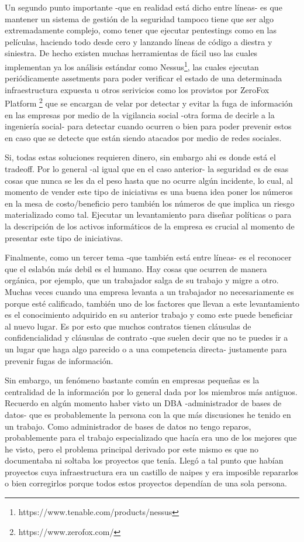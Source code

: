 \documentclass[11pt]{utalcaDoc}
\begin{document}
Un segundo punto importante -que en realidad está dicho entre líneas- es que mantener un sistema de gestión de la seguridad tampoco tiene que ser algo extremadamente complejo, como tener que ejecutar pentestings como en las películas, haciendo todo desde cero y lanzando líneas de código a diestra y siniestra. De hecho existen muchas herramientas de fácil uso las cuales implementan ya los análisis estándar como Nessus\footnote{https://www.tenable.com/products/nessus}, las cuales ejecutan periódicamente assetments para poder verificar el estado de una determinada infraestructura expuesta u otros serivicios como los provistos por ZeroFox Platform \footnote{https://www.zerofox.com/} que se encargan de velar por detectar y evitar la fuga de información en las empresas por medio de la vigilancia social -otra forma de decirle a la ingeniería social- para detectar cuando ocurren o bien para poder prevenir estos en caso que se detecte que están siendo atacados por medio de redes sociales.

Si, todas estas soluciones requieren dinero, sin embargo ahi es donde está el tradeoff. Por lo general -al igual que en el caso anterior- la seguridad es de esas cosas que nunca se les da el peso hasta que no ocurre algún incidente, lo cual, al momento de vender este tipo de iniciativas es una buena idea poner los números en la mesa de costo/beneficio pero también los números de que implica un riesgo materializado como tal. Ejecutar un levantamiento para diseñar políticas o para la descripción de los activos informáticos de la empresa es crucial al momento de presentar este tipo de iniciativas.

Finalmente, como un tercer tema -que también está entre líneas- es el reconocer que el eslabón más debil es el humano. Hay cosas que ocurren de manera orgánica, por ejemplo, que un trabajador salga de su trabajo y migre a otro. Muchas veces cuando una empresa levanta a un trabajador no necesariamente es porque esté calificado, también uno de los factores que llevan a este levantamiento es el conocimiento adquirido en su anterior trabajo y como este puede beneficiar al nuevo lugar. Es por esto que muchos contratos tienen cláusulas de confidencialidad y cláusulas de contrato -que suelen decir que no te puedes ir a un lugar que haga algo parecido o a una competencia directa- justamente para prevenir fugas de información.

Sin embargo, un fenómeno bastante común en empresas pequeñas es la centralidad de la información por lo general dada por los miembros más antiguos. Recuerdo en algún momento haber visto un DBA -administrador de bases de datos- que es probablemente la persona con la que más discusiones he tenido en un trabajo. Como administrador de bases de datos no tengo reparos, probablemente para el trabajo especializado que hacía era uno de los mejores que he visto, pero el problema principal derivado por este mismo es que no documentaba ni soltaba los proyectos que tenía. Llegó a tal punto que habían proyectos cuya infraestructura era un castillo de naipes y era imposible repararlos o bien corregirlos porque todos estos proyectos dependían de una sola persona.
\end{document}
